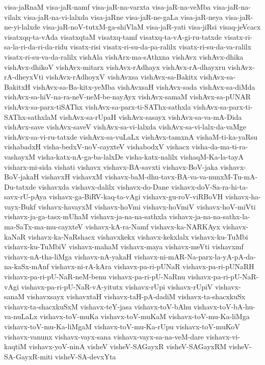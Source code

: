 {visa-jaRnaM
visa-jaR-namf
visa-jaR-na-varxta
visa-jaR-na-veMba
visa-jaR-na-vilalx
visa-jaR-na-vi-lalxda
visa-jaRne
visa-jaR-ne-gaLa
visa-jaR-neya
visa-jaR-ne-yi-lalxde
visa-jaR-noV-tutxM-ga-shiVlaM
visa-jaR-yati
visa-jiRsi
visaq-jeVcacx
visatxqq-ta-vAda
visatxqtaM
visatxq-tamf
visatxq-ta-vA-gi-ru-tatxde
visatx-ri-sa-la-ri-da-ri-da-ridu
visatx-risi
visatx-ri-su-da-pa-ralilx
visatx-ri-su-da-va-ralilx
visatx-ri-su-va-da-ralilx
vishAla
vishArx-ma-sAthxna
vishAvx
vishAvx-dhika
vishAvx-dhikoV
vishAvx-mitarx
vishAvx-rAdhayx
vishAvx-rA-dhayxru
vishAvx-rA-dheyxVti
vishAvx-rAdhoyxV
vishAvxsa
vishAvx-sa-Bakitx
vishAvx-sa-BakitxH
vishAvx-sa-Ba-kitx-yeMba
vishAvxsaH
vishAvx-sada
vishAvx-sa-diMda
vishAvx-sa-hiV-na-ra-neV-neM-be-nayAyx
vishAvx-samaM
vishAvx-sa-pUNAR
vishAvx-sa-parx-tiSAThx
vishAvx-sa-parx-ti-SAThx-sathxla
vishAvx-sa-parx-ti-SAThx-sathxlaM
vishAvx-sa-rUpaH
vishAvx-sasayx
vishAvx-sa-va-mA-Dida
vishAvx-save
vishAvx-saveV
vishAvx-sa-vi-lalxda
vishAvx-sa-vi-lalx-da-vaMge
vishAvx-sa-vi-ru-tatxde
vishAvx-sa-vuLaLx
vishAvx-tamxnA
vishaM-ti-ka-yaRsu
vishabadxH
visha-bedxV-noV-cayxteV
vishabodxV
vishacx
visha-da-ma-ti-ra-vashayxM
visha-katx-nA-ga-ba-lalxDe
visha-katx-nalilx
vishaqM-Ka-la-tayA
visharx-mi-sida
vishati
vishavx
vishavx-BA-savxti
vishavx-BoV-jaka
vishavx-BoV-jakaH
vishavxH
vishavxM
vishavx-baM-dhu-tavx-BA-va-va-nunxM-Tu-mA-Du-tatxde
vishavxda
vishavx-dalilx
vishavx-do-Dane
vishavx-doV-Sa-ra-hi-ta-savx-rU-pAya
vishavx-ga-BiRV-kaq-ta-vAgi
vishavx-gu-roV-viRBoVH
vishavx-ha-vayx-Bukf
vishavx-havayxM
vishavx-hoVmi
vishavx-hoVmiV
vishavx-hoV-miVti
vishavx-ja-ga-tasx-mUhaM
vishavx-ja-na-na-sathxla
vishavx-ja-na-na-sathx-la-ma-SaTx-ma-mu-cayxteV
vishavx-kA-ra-Namf
vishavx-ka-NARKAyx
vishavx-kaNaR
vishavx-ka-NaRshacx
vishavxkekx
vishavx-kekxlalx
vishavx-ku-TuMbi
vishavx-ku-TuMbiV
vishavx-mahaM
vishavx-maya
vishavx-meVti
vishavxmf
vishavx-nA-tha-liMga
vishavx-nA-yakaH
vishavx-ni-mAR-Na-parx-la-yA-pA-da-na-kaSx-mAnf
vishavx-ni-rA-kAra
vishavx-pa-ri-pUNaR
vishavx-pa-ri-pUNaRH
vishavx-pa-ri-pU-NaR-neM-benu
vishavx-pa-ri-pU-NaRnu
vishavx-pa-ri-pU-NaR-vAgi
vishavx-pa-ri-pU-NaR-vA-yitutx
vishavx-rUpi
vishavx-rUpiV
vishavx-sanaM
vishavxsayx
vishavxtaH
vishavx-taH-pA-dadiM
vishavx-ta-shacxkuSx
vishavx-ta-shacxkuSxM
vishavx-teY-jasa
vishavx-toV-bAhu
vishavx-toV-bA-hu-va-nuLaLx
vishavx-toV-muKa
vishavx-toV-muKaM
vishavx-toV-mu-Ka-liMga
vishavx-toV-mu-Ka-liMgaM
vishavx-toV-mu-Ka-rUpu
vishavx-toV-muKoV
vishavx-vanunx
vishavx-vayx-sana
vishavx-vayx-sa-na-veM-dare
vishavx-vi-kaqtiM
vishavx-yoV-ninA
visheV
visheV-SAGayxR
visheV-SAGayxRM
visheV-SA-GayxR-miti
visheV-SA-devxYta
}
